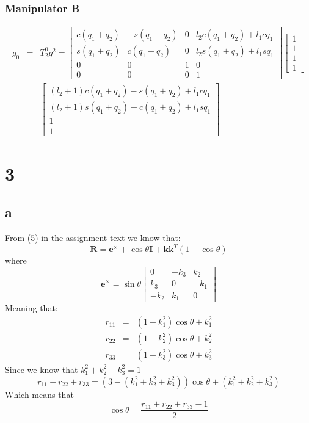 \documentclass[11pt]{article}
\begin{document}
\subsubsection*{Manipulator B}
\begin{eqnarray*}
g_0 &=& T^0_2 g^2 = 
\begin{bmatrix}
c (q_1 + q_2) & - s (q_1 + q_2) & 0  & l_2 c (q_1 + q_2) + l_1 c q_1 \\
s (q_1 + q_2) & c (q_1 + q_2)   & 0  & l_2 s (q_1 + q_2) + l_1 s q_1 \\
0     & 0       & 1  & 0        \\
0     & 0       & 0  & 1
\end{bmatrix}
\begin{bmatrix}
1 \\
1 \\
1 \\
1
\end{bmatrix} \\
&=&
\begin{bmatrix}
(l_2 + 1) c (q_1 + q_2) - s (q_1 + q_2) + l_1 c q_1 \\
(l_2 + 1) s (q_1 + q_2) + c (q_1 + q_2) + l_1 s q_1 \\
1 \\
1
\end{bmatrix}
\end{eqnarray*}

\section*{3}
\subsection*{a}
From (5) in the assignment text we know that:
\[\mathbf{R} = \mathbf{e}^\times + \cos{\theta \mathbf{I}} + \mathbf{k}\mathbf{k}^T (1 - \cos{\theta}) \]
where
\[\mathbf{e}^\times = \sin{\theta}
\begin{bmatrix}
0 & -k_3 & k_2 \\
k_3 & 0 & -k_1 \\
-k_2 & k_1 & 0
\end{bmatrix}
\]
Meaning that:
\begin{eqnarray*}
r_{11} &=& (1-k_1^2)\cos{\theta} + k_1^2 \\
r_{22} &=& (1-k_2^2)\cos{\theta} + k_2^2 \\
r_{33} &=& (1-k_3^2)\cos{\theta} + k_3^2
\end{eqnarray*}
Since we know that $k_1^2 + k_2^2 + k_3^2 = 1$
\[r_{11} + r_{22} + r_{33} = (3 - (k_1^2 + k_2^2 + k_3^2))\cos{\theta} + (k_1^2 + k_2^2 + k_3^2)\]
Which means that
\[\cos{\theta} = \frac{r_{11} + r_{22} + r_{33} - 1}{2}\]
\end{document}

